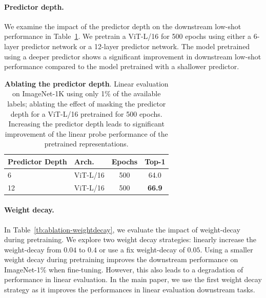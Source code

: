 \documentclass[10pt,twocolumn,letterpaper]{article}
\newcommand{\cc}{\cellcolor{fbApp}}
\begin{document}
\paragraph{Predictor depth.}
We examine the impact of the predictor depth on the downstream low-shot performance in Table~\ref{tb:ablation-preddepth}.
We pretrain a ViT-L/16 for 500 epochs using either a 6-layer predictor network or a 12-layer predictor network.
The model pretrained using a deeper predictor shows a significant improvement in downstream low-shot performance compared to the model pretrained with a shallower predictor.
\begin{table}[h]
     \centering
     \begin{tabular}{l l c c}
         \bf\small Predictor Depth & \bf\small Arch. & \bf\small Epochs & \bf\small Top-1 \\
         \toprule
         \small 6  & \small ViT-L/16 & 500 & 64.0 \\
         \cc\small 12 & \cc\small ViT-L/16 & \cc 500 & \cc\bf  66.9
     \end{tabular}
     \caption{\textbf{Ablating the predictor depth}.
       Linear evaluation on ImageNet-1K using only 1\% of the available labels; ablating the effect of masking the predictor depth for  a ViT-L/16 pretrained for  500 epochs.
       Increasing the predictor depth leads to significant improvement of the linear probe performance of the pretrained representations.}
     \label{tb:ablation-preddepth}
\end{table}




\paragraph{Weight decay.} In Table~\ref{tb:ablation-weightdecay}, we evaluate the impact of weight-decay during pretraining. We explore two weight decay strategies: linearly increase the weight-decay from $0.04$ to $0.4$ or use a fix weight-decay of $0.05$. Using a smaller weight decay during pretraining improves the downstream performance on ImageNet-1\% when fine-tuning. However, this also leads to a degradation of performance in linear evaluation. In the main paper, we use the first weight decay strategy as it improves the performances in linear evaluation downstream tasks.
\end{document}
